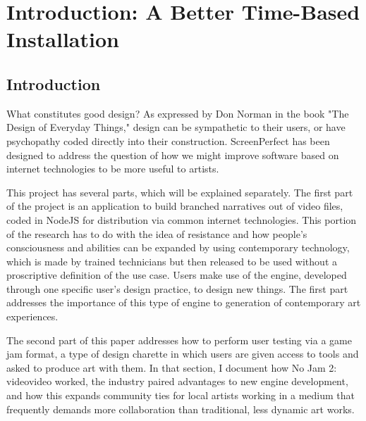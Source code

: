 
\chapter{Introduction: A Better Time-Based Installation} %

\label{Chapter1} %


\section{Introduction}

What constitutes good design? As expressed by Don Norman in the book "The Design of Everyday Things," design can be sympathetic to their users, or have psychopathy coded directly into their construction. ScreenPerfect has been designed to address the question of how we might improve software based on internet technologies to be more useful to artists.

This project has several parts, which will be explained separately. The first part of the project is an application to build branched narratives out of video files, coded in NodeJS for distribution via common internet technologies. This portion of the research has to do with the idea of resistance and how people's consciousness and abilities can be expanded by using contemporary technology, which is made by trained technicians but then released to be used without a proscriptive definition of the use case. Users make use of the engine, developed through one specific user's design practice, to design new things. The first part addresses the importance of this type of engine to generation of contemporary art experiences.

The second part of this paper addresses how to perform user testing via a game jam format, a type of design charette in which users are given access to tools and asked to produce art with them. In that section, I document how No Jam 2: videovideo worked, the industry paired advantages to new engine development, and how this expands community ties for local artists working in a medium that frequently demands more collaboration than traditional, less dynamic art works.

